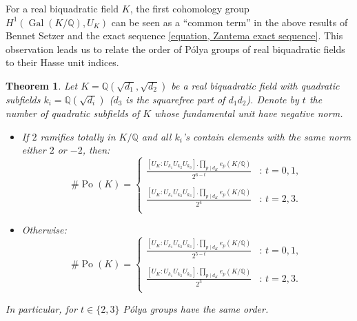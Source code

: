 \documentclass{jams-l}
\newtheorem{theorem}{Theorem}[section]
\theoremstyle{definition}
\theoremstyle{remark}
\numberwithin{equation}{section}
\DeclareMathOperator{\Po}{Po}
\DeclareMathOperator{\Gal}{Gal}
\begin{document}
For a real biquadratic field $K$,  the first cohomology group $H^1(\Gal(K/\mathbb{Q}),U_K)$ can be seen as a ``common term'' in the above results of Bennet Setzer and the exact sequence \eqref{equation, Zantema exact sequence}. This observation leads us to relate the order of P\'olya groups of real biquadratic fields to their Hasse unit indices.

\begin{theorem} \label{theorem, relatione between order of Polya group and unit index}
Let $K=\mathbb{Q}(\sqrt{d_1},\sqrt{d_2})$ be a real biquadratic field with quadratic subfields $k_i=\mathbb{Q}(\sqrt{d_i})$ ($d_3$ is the squarefree part of $d_1 d_2$). Denote by $t$ the number of quadratic subfields of $K$ whose fundamental unit have negative norm. 
\begin{itemize}
\item[(i)] If $2$ ramifies totally in $K/\mathbb{Q}$ and all $k_i$'s contain elements with the same norm either $2$ or $-2$, then:
\begin{equation*}
    \# \Po(K) = \begin{cases}
               \frac{	\left[U_K : U_{k_1} U_{k_2} U_{k_3}\right]. \prod_{p \mid d_K}e_p(K/\mathbb{Q})}{2^{6-t}}              & : \,  t = 0,1, \\
                & \\ 
               \frac{	\left[U_K : U_{k_1} U_{k_2} U_{k_3}\right]. \prod_{p \mid d_K}e_p(K/\mathbb{Q})}{2^4}              & : \, t =2,3.\\
           \end{cases}
\end{equation*}

\item[(ii)] Otherwise:
\begin{equation*}
    \# \Po(K) = \begin{cases}
               \frac{	\left[U_K : U_{k_1} U_{k_2} U_{k_3}\right]. \prod_{p \mid d_K}e_p(K/\mathbb{Q})}{2^{5-t}}              & : \,  t = 0,1, \\
               & \\
               \frac{	\left[U_K : U_{k_1} U_{k_2} U_{k_3}\right]. \prod_{p \mid d_K}e_p(K/\mathbb{Q})}{2^3}              & : \, t=2,3.\\
           \end{cases}
\end{equation*}
\end{itemize}
In particular, for $t\in \{2,3\}$  P\'olya groups have the same order.
\end{theorem}
\end{document}
